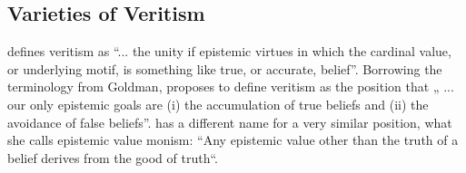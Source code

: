 \documentclass[12pt,numbers=noenddot]{scrartcl}
\begin{document}





\subsection{Varieties of Veritism}\label{sec:varieties}

\textcite[54]{Goldman2002-GOLTUO-2} defines veritism as  “... the unity if epistemic virtues in which the cardinal value, or underlying motif, is something like true, or accurate, belief”. Borrowing the terminology from Goldman, \textcite[360]{Berker2013-BERETA-2} proposes to define veritism as the position that „ ... our only epistemic goals are (i) the accumulation of true beliefs and (ii) the avoidance of false beliefs”. \textcite{Zagzebski2004-ZAGEVM-2} has a different name for a very similar position, what she calls epistemic value monism: “Any epistemic value other than the truth of a belief derives from the good of truth“. 
\end{document}

